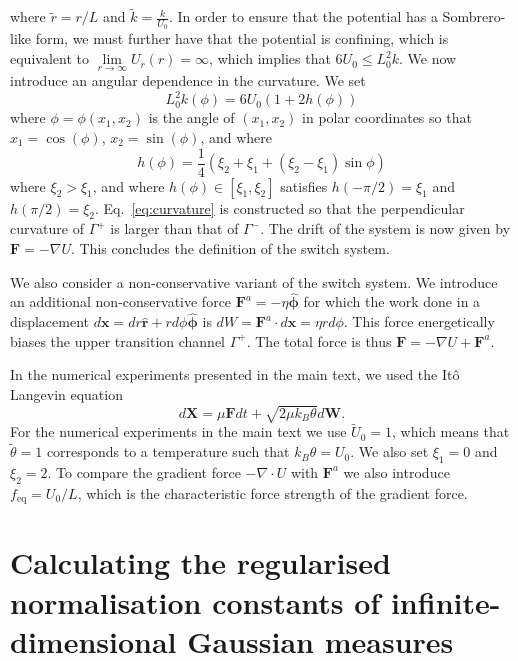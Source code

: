 \documentclass[withindex,glossary,techreport]{cam-thesis}
\begin{document}
\begin{appendices}
\begin{equation}
\end{equation}
where $\tilde{r} = r / L$ and $\tilde{k} = \frac{k}{U_0}$. In order to ensure that the potential has a Sombrero-like form, we
must further have that the potential is confining, which is equivalent
to $\underset{r\to\infty}{\lim}U_{r}(r)=\infty$, which implies that
$6U_{0}\leq L_0^{2}k$. We now introduce an angular dependence in the
curvature. We set
\begin{equation}
L_0^{2}k(\phi)=6U_{0}(1+2h(\phi))\label{eq:curvature}
\end{equation}
where $\phi=\phi(x_{1},x_{2})$ is the angle of $(x_{1},x_{2})$ in
polar coordinates so that $x_{1}=\cos(\phi)$, $x_{2}=\sin(\phi)$,
and where
\begin{equation}
h(\phi)=\frac{1}{4}\left(\xi_{2}+\xi_{1}+(\xi_{2}-\xi_{1})\sin\phi\right)
\end{equation}
where $\xi_{2}>\xi_{1}$, and where $h(\phi)\in[\xi_{1},\xi_{2}]$
satisfies $h(-\pi/2)=\xi_{1}$ and $h(\pi/2)=\xi_{2}$. Eq.~\eqref{eq:curvature}
is constructed so that the perpendicular curvature of $\Gamma^{+}$
is larger than that of $\Gamma^{-}$. The drift of the system is now
given by $\mathbf{F}=-\nabla U$. This concludes the definition of the switch system.

We also consider a non-conservative variant of the switch system. We introduce an additional non-conservative
force $\mathbf{F}^{a}=-\eta\hat{\boldsymbol{\phi}}$ for which the
work done in a displacement $d\mathbf{x}=dr\hat{\mathbf{r}}+rd\phi\hat{\boldsymbol{\phi}}$
is $dW=\mathbf{F}^{a}\cdot d\mathbf{x}=\eta rd\phi$. This force energetically
biases the upper transition channel $\Gamma^{+}$. The total force
is thus $\mathbf{F}=-\nabla U+\mathbf{F}^{a}$.

In the numerical experiments presented in the main text, we used the
Itô Langevin equation 
\begin{equation}
d\mathbf{X}=\mu\mathbf{F}dt+\sqrt{2\mu k_{B}\theta}d\mathbf{W}.\label{eq:langevin equation}
\end{equation}
For the numerical experiments in the main text  we use $\tilde{U}_{0}=1$,
which means that $\tilde{\theta}=1$ corresponds to a temperature
such that $k_{B}\theta=U_{0}$. We also set $\xi_{1}=0$ and $\xi_{2}=2$.
To compare the gradient force $-\nabla \cdot U$ with $\mathbf{F}^{a}$ we also introduce
$f_{\text{eq}}=U_{0}/L$, which is the characteristic force strength
of the gradient force.

\chapter{Calculating the regularised normalisation constants of infinite-dimensional Gaussian measures} \label{app:Calculation of the Gaussian normalisation constants}


\end{appendices}
\end{document}
